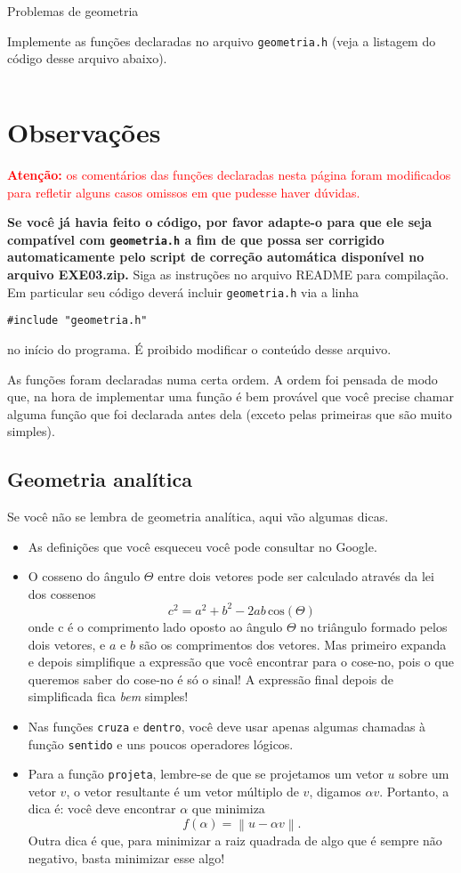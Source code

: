\documentclass[12pt,a4paper,pdflatex]{article}
\newcommand{\norm}[1]{\left\lVert#1\right\rVert}
\begin{document}
\begin{center}
  {\LARGE Problemas de geometria}
\end{center}
\bigskip 

Implemente as funções declaradas no arquivo \texttt{geometria.h} (veja a listagem do código desse arquivo abaixo).

\inputminted{C}{geometria.h}

\section* {Observações}

\textcolor{red}{\textbf{Atenção:} os comentários das funções declaradas nesta página
  foram modificados para refletir alguns casos omissos em que pudesse haver dúvidas.}

\textbf{Se você já havia feito o código, por favor adapte-o para que
  ele seja compatível com \texttt{geometria.h} a fim de que possa ser
  corrigido automaticamente pelo script de correção automática
  disponível no arquivo EXE03.zip.} Siga as instruções no arquivo
README para compilação. Em particular seu código deverá incluir
\texttt{geometria.h} via a linha
\begin{verbatim}
#include "geometria.h"
\end{verbatim}
no início do programa. É proibido modificar o conteúdo desse arquivo. 

As funções foram declaradas numa certa ordem. A ordem foi pensada de
modo que, na hora de implementar uma função é bem provável que você
precise chamar alguma função que foi declarada antes dela (exceto
pelas primeiras que são muito simples).

\subsection* {Geometria analítica}
Se você não se lembra de geometria analítica, aqui vão algumas dicas.
\begin{itemize}
\item As definições que você esqueceu você pode consultar no Google.
\item O cosseno do ângulo $\Theta$ entre dois vetores pode ser
  calculado através da lei dos cossenos
  \[
  c^2 = a^2 + b^2 - 2ab\,\mathrm{cos}(\Theta)
  \]
onde c é o comprimento lado oposto ao ângulo $\Theta$ no triângulo formado pelos dois vetores, e $a$ e $b$ são os comprimentos dos vetores. Mas primeiro expanda e depois simplifique a expressão que você encontrar para o cose-no, pois o que queremos saber do cose-no é só o sinal! A expressão final depois de simplificada fica \emph{bem} simples!
\item Nas funções \texttt{cruza} e \texttt{dentro}, você deve usar apenas algumas chamadas à função \texttt{sentido} e uns poucos operadores lógicos.
\item Para a função \texttt{projeta}, lembre-se de que se projetamos um vetor $u$ sobre um vetor $v$, o vetor resultante é um vetor múltiplo de $v$, digamos $\alpha v$. Portanto, a dica é: você deve encontrar $\alpha$ que minimiza
  \[
  f(\alpha) = \norm{u - \alpha v}.
  \]
Outra dica é que, para minimizar a raiz quadrada de algo que é sempre não negativo, basta minimizar esse algo! 
\end{itemize}
\end{document}

